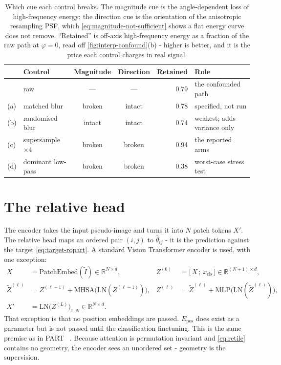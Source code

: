 \documentclass[final_report.tex]{subfiles}
\begin{document}
\begin{table}[htbp]
  \centering
    \caption[The four interpolation controls]{Which cue each control breaks. The
    magnitude cue is the angle-dependent loss of high-frequency energy; the direction
    cue is the orientation of the anisotropic resampling PSF, which
    \cref{eq:magnitude-not-sufficient} shows a flat energy curve does not remove.
    ``Retained'' is off-axis high-frequency energy as a fraction of the raw path at
    $\varphi = 0$, read off \cref{fig:interp-confound}(b) - higher is better, and it
    is the price each control charges in real signal.}
    \label{tab:controls}
    \begin{tabular}{llccr l}
      \toprule
      & Control & Magnitude & Direction & Retained & Role \\
      \midrule
      & raw                        & ---     & ---     & 0.79 & the confounded path \\
      (a) & matched blur           & broken  & intact  & 0.78 & specified, not run \\
      (b) & randomised blur        & intact  & intact  & 0.74 & weakest; adds variance only \\
      (c) & supersample $\times 4$ & broken  & broken  & 0.94 & the reported arms \\
      (d) & dominant low-pass      & broken  & broken  & 0.38 & worst-case stress test \\
      \bottomrule
    \end{tabular}
\end{table}

\section{The relative head}\label{sec:relative-head}
The encoder takes the input pseudo-image and turns it into $N$ patch tokens $X'$. The relative head maps an ordered pair $(i,j)$ to $\hat\theta_{ij}$ - it is the prediction against the target \cref{eq:target-ropart}. A standard Vision Transformer encoder is used, with one exception:
\begin{align}
  X &= \mathrm{PatchEmbed}(\tilde I) \in \mathbb{R}^{N \times d},
  &
  Z^{(0)} &= \bigl[\,X \,;\, x_{\mathrm{cls}}\,\bigr] \in \mathbb{R}^{(N+1) \times d},
  \label{eq:vit-embed}\\
  \tilde Z^{(\ell)} &= Z^{(\ell-1)} + \mathrm{MHSA}\bigl(\mathrm{LN}(Z^{(\ell-1)})\bigr),
  &
  Z^{(\ell)} &= \tilde Z^{(\ell)} + \mathrm{MLP}\bigl(\mathrm{LN}(\tilde Z^{(\ell)})\bigr),
  \label{eq:vit-block}\\
  X' &= \mathrm{LN}\bigl(Z^{(L)}\bigr)_{1:N} \in \mathbb{R}^{N \times d}.
  &&
  \label{eq:vit-out}
\end{align}
That exception is that no position embeddings are passed. $E_{\mathrm{pos}}$ does exist as a parameter but is not passed until the classification finetuning. This is the same premise as in PART ~\cite{part}. Because attention is permutation invariant and \cref{eq:retile} contains no geometry, the encoder sees an unordered set - geometry is the supervision.
\end{document}
